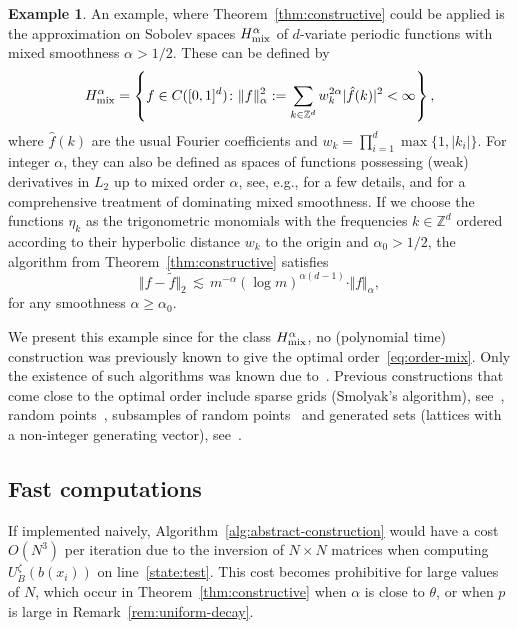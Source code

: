 \documentclass[a4paper,11pt]{article}
\renewcommand{\(}{\left (}
\renewcommand{\)}{\right )}
\newcommand{\<}{\langle}
\renewcommand{\>}{\rangle}
\newcommand{\Z}{\mathbb{Z}}
\theoremstyle{definition}
\newtheorem{example}[theorem]{Example}
\begin{document}
\begin{example}
\label{ex:mixed-smoothness}
    An example, where Theorem~\ref{thm:constructive} could be applied
    is the approximation on Sobolev spaces $H^\alpha_{\rm mix}$
    of $d$-variate periodic functions with mixed smoothness $\alpha>1/2$.
    These can be defined by 
    \[
     H^\alpha_{\rm mix} =
     \left\{ f \in C([0,1]^d) \colon \Vert f \Vert_{\alpha}^2 := \sum_{ k \in \Z^d} w_{ k}^{2\alpha} |\hat{f}( k)|^2 < \infty \right\},
    \]
    where $\hat{f}( k)$ are the usual Fourier coefficients and $w_{ k} = \prod_{i=1}^d \max\{1,|k_i|\}$. 
    For integer $\alpha$, they can also be defined as spaces of functions possessing (weak) derivatives 
    in $L_2$ up to mixed order $\alpha$,
    see, e.g., \cite[Sec.\,2.1]{KSU} for a few details,
    and \cite{DTU} for a comprehensive treatment of dominating mixed smoothness.
    If we choose the functions $\eta_k$ as the trigonometric monomials
    with the frequencies $k \in \Z^d$ ordered according to their hyperbolic distance $w_{k}$ to the origin
    and $\alpha_0>1/2$,
    the algorithm from Theorem~\ref{thm:constructive} satisfies
    \begin{equation}\label{eq:order-mix}
     \Vert f - \tilde f \Vert_2 \,\lesssim\, m^{-\alpha} 
     (\log m)^{\alpha(d-1)} 
     \cdot \Vert f \Vert_{\alpha},
    \end{equation}
    for any smoothness $\alpha\geq \alpha_0$.
    
    We present this example since
    for the class $H^\alpha_{\rm mix}$,
    no (polynomial time) construction was previously known to give the optimal order~\eqref{eq:order-mix}.
    Only the existence of such algorithms was known due to~\cite{DKU}.
    Previous constructions that come close to the optimal order include sparse grids (Smolyak's algorithm), see~\cite{SU},
    random points~\cite{KU1},
    subsamples of random points~\cite{BSU}
    and generated sets (lattices with a non-integer generating vector), see~\cite{CNW}.
    \end{example}


\subsection{Fast computations}
\label{subsec:fast-comp}

If implemented naively, Algorithm~\ref{alg:abstract-construction} would have a cost $O(N^3)$ per iteration due to the inversion of $N\times N$ matrices when computing $U_B^\zeta(b(x_i))$ on line~\ref{state:test}. This cost becomes prohibitive for large values of $N$, which occur in Theorem~\ref{thm:constructive} when $\alpha$ is close to $\theta$, or when $p$ is large in Remark~\ref{rem:uniform-decay}.
\end{document}
